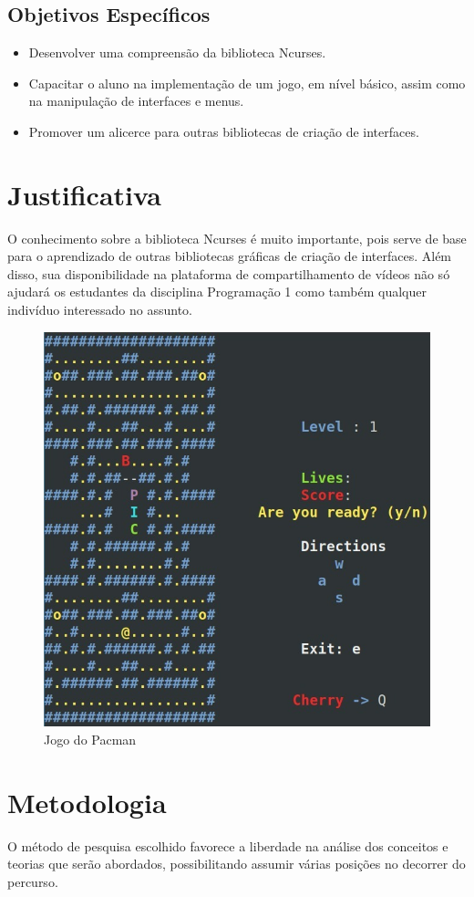 \documentclass[a4paper,10pt]{article} %
\begin{document}
\subsection{Objetivos Específicos}

\begin{itemize}
 \item Desenvolver uma compreensão da biblioteca Ncurses.
 \item Capacitar o aluno na implementação de um jogo, em nível básico, assim como na manipulação de interfaces e menus.
 \item Promover um alicerce para outras bibliotecas de criação de interfaces.
\end{itemize}


\section{Justificativa}

O conhecimento sobre a biblioteca Ncurses é muito importante, pois serve de base para o aprendizado de outras bibliotecas gráficas de criação de interfaces. Além disso, sua disponibilidade na plataforma de compartilhamento de vídeos não só ajudará os estudantes da disciplina Programação 1 como também qualquer indivíduo interessado no assunto.

\begin{figure}[!htbp] %
\centering
\includegraphics[width=.40\linewidth]{imagem.jpg}
\caption{Jogo do Pacman}
\label{fig:xsort}
\end{figure}


\section{Metodologia}

O método de pesquisa escolhido favorece a liberdade na análise dos conceitos e teorias que serão abordados, possibilitando assumir várias posições no decorrer do percurso.
\end{document}
